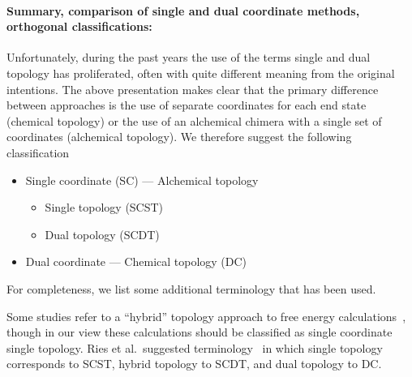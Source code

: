 \documentclass[9pt,bestpractices]{livecoms}
\newcommand{\sbnote}[1]{%
  {\bfseries{}[SB: }%
  {\textcolor{blue}{#1}}{\bfseries{}]}
}
\begin{document}

\paragraph{Summary, comparison of single and dual coordinate methods, orthogonal classifications:}


Unfortunately, during the past years the use of the terms single and dual topology has proliferated, often with quite different meaning from the original intentions. The above presentation makes clear that the primary difference between approaches is the use of separate coordinates for each end state (chemical topology) or the use of an alchemical chimera with a single set of coordinates (alchemical topology). We therefore suggest the following classification
\begin{itemize}
\item Single coordinate (SC) --- Alchemical topology
  \begin{itemize}
  \item Single topology (SCST)
    \item Dual topology (SCDT)
  \end{itemize}
  \item Dual coordinate --- Chemical topology (DC)
  \end{itemize}
For completeness, we list some additional terminology that has been used.

Some studies refer to a ``hybrid'' topology approach to free energy calculations~\cite{gapsys2015pmx, gapsys2016accurate, gapsys2020large}, though in our view these calculations should be classified as single coordinate single topology.  %
Ries et al.\ suggested terminology~\cite{Ries_2022} in which single topology corresponds to SCST, hybrid topology to SCDT, and dual topology to DC.
\end{document}
